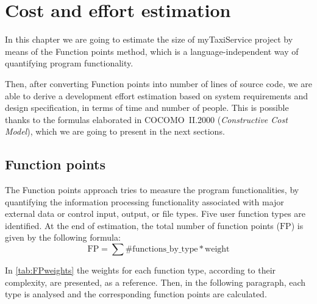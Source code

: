 \chapter{Cost and effort estimation}\label{chap:estimation}



In this chapter we are going to estimate the size of myTaxiService project by means of the Function points method, which is a language-independent way of quantifying program functionality.

Then, after converting Function points into number of lines of source code, we are able to derive a development effort estimation based on system requirements and design specification, in terms of time and number of people. This is possible thanks to the formulas elaborated in \mbox{COCOMO II.2000} (\emph{Constructive Cost Model}), which we are going to present in the next sections.


\newcommand{\mSize}{\mathbf{s}}
\newcommand{\mFP}{\text{FP}}
\newcommand{\mEffort}{\mathbf{e}}
\newcommand{\eaf}{\text{EAF}}  %
\newcommand{\myW}{1.5cm}


\section{Function points}

The Function points approach tries to measure the program functionalities, by quantifying the information processing functionality associated with major external data or control input, output, or file types. Five user function types are identified. At the end of estimation, the total number of function points ($ \mFP $) is given by the following formula:
\begin{equation}
\mFP = \sum \text{\#functions\_by\_type} * \text{weight} \label{eqn:fp}
\end{equation}


In \cref{tab:FPweights} the weights for each function type, according to their complexity, are presented, as a reference. Then, in the following paragraph, each type is analysed and the corresponding function points are calculated.


